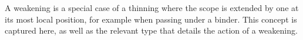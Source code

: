 
A weakening is a special case of a thinning where the scope is extended by
one at its most local position, for example when passing under a binder.
This concept is captured here, as well as the relevant type that details
the action of a weakening.

